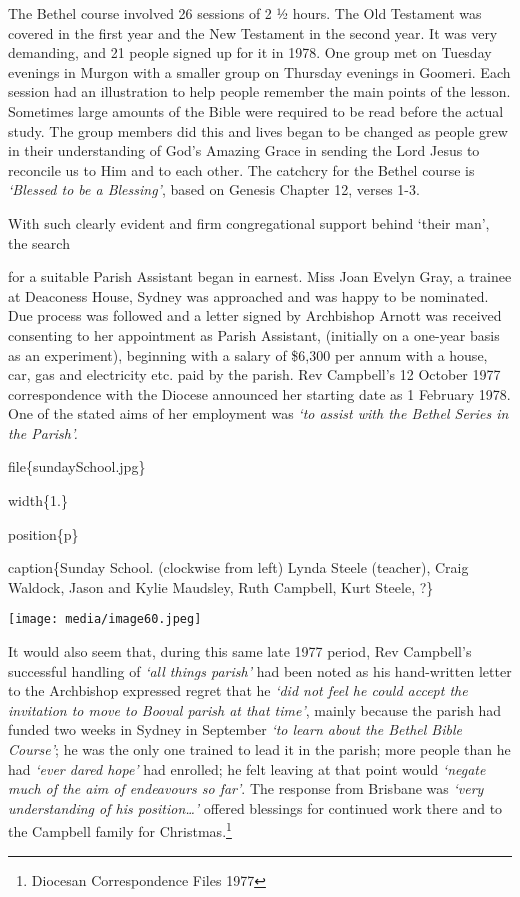 The Bethel course involved 26 sessions of 2 ½ hours. The Old Testament was covered in the first year and the New Testament in the second year. It was very demanding, and 21 people signed up for it in 1978. One group met on Tuesday evenings in Murgon with a smaller group on Thursday evenings in Goomeri. Each session had an illustration to help people remember the main points of the lesson. Sometimes large amounts of the Bible were required to be read before the actual study. The group members did this and lives began to be changed as people grew in their understanding of God's Amazing Grace in sending the Lord Jesus to reconcile us to Him and to each other. The catchcry for the Bethel course is \emph{`Blessed to be a Blessing'}, based on Genesis Chapter 12, verses 1-3.

With such clearly evident and firm congregational support behind `their man', the search

for a suitable Parish Assistant began in earnest. Miss Joan Evelyn Gray, a trainee at Deaconess House, Sydney was approached and was happy to be nominated. Due process was followed and a letter signed by Archbishop Arnott was received consenting to her appointment as Parish Assistant, (initially on a one-year basis as an experiment), beginning with a salary of \$6,300 per annum with a house, car, gas and electricity etc. paid by the parish. Rev Campbell's 12 October 1977 correspondence with the Diocese announced her starting date as 1 February 1978. One of the stated aims of her employment was \emph{`to assist with the Bethel Series in the Parish'.}

file\{sundaySchool.jpg\}

width\{1.\}

position\{p\}

caption\{Sunday School. (clockwise from left) Lynda Steele (teacher), Craig Waldock, Jason and Kylie Maudsley, Ruth Campbell, Kurt Steele, ?\}

\texttt{[image: media/image60.jpeg]}

It would also seem that, during this same late 1977 period, Rev Campbell's successful handling of \emph{`all things parish'} had been noted as his hand-written letter to the Archbishop expressed regret that he \emph{`did not feel he could accept the invitation to move to Booval parish at that time'}, mainly because the parish had funded two weeks in Sydney in September \emph{`to learn about the Bethel Bible Course'}; he was the only one trained to lead it in the parish; more people than he had \emph{`ever dared hope'} had enrolled; he felt leaving at that point would \emph{`negate much of the aim of endeavours so far'}. The response from Brisbane was \emph{`very understanding of his position\ldots'} offered blessings for continued work there and to the Campbell family for Christmas.\footnote{Diocesan Correspondence Files 1977}

